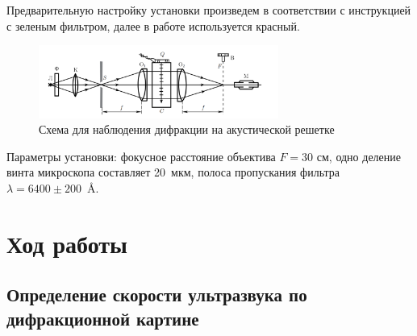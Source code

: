 \documentclass[a4paper, 12pt]{article}%
\begin{document}
    Предварительную настройку установки произведем в соответствии с инструкцией с зеленым фильтром, далее в работе используется красный.
    
    	\begin{figure}[h!]
    	\centering	
    	\includegraphics[width=0.7\textwidth]{images/stand.png}
    	\caption{Схема для наблюдения дифракции на акустической решетке}
    	\label{shema1}
    \end{figure}
    
    Параметры установки: фокусное расстояние объектива $F = 30 $ см, одно деление винта микроскопа составляет 20~мкм, полоса пропускания фильтра \mbox{$\lambda = 6400\pm 200$ Å}.
    

\section*{Ход работы}

\subsection*{Определение скорости ультразвука по дифракционной картине}
\end{document}
